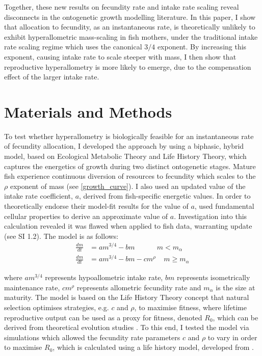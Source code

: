 \documentclass[a4paper]{article} %
\begin{document}
    Together, these new results on fecundity rate and intake rate scaling reveal disconnects in the ontogenetic growth modelling literature. In this paper, I show that allocation to fecundity, as an instantaneous rate, is theoretically unlikely to exhibit hyperallometric mass-scaling in fish mothers, under the traditional intake rate scaling regime which uses the canonical $3/4$ exponent. By increasing this exponent, causing intake rate to scale steeper with mass, I then show that reproductive hyperallometry is more likely to emerge, due to the compensation effect of the larger intake rate.
\section{Materials and Methods}\thispagestyle{plain}

To test whether hyperallometry is biologically feasible for an instantaneous rate of fecundity allocation, I developed the \textcite{Charnov2001} approach by using a biphasic, hybrid model, based on Ecological Metabolic Theory and Life History Theory, which captures the energetics of growth during two distinct ontogenetic stages. Mature fish experience continuous diversion of resources to fecundity which scales to the $\rho$ exponent of mass (see \cref{growth_curve}). I also used an updated value of the intake rate coefficient, $a$, derived from fish-specific energetic values. In order to theoretically endorse their model-fit results for the value of $a$, \textcite{West2001} used fundamental cellular properties to derive an approximate value of $a$. Investigation into this calculation revealed it was flawed when applied to fish data, warranting update (see SI 1.2). The model is as follows:
\begin{align}
    \frac{dm}{dt} &= am^{3/4} - bm \ \ \ \ \ \ \ \ \ \ \ \ \ \ m < m_{\alpha} \label{luke_model_juvenile}\\
    \frac{dm}{dt} &= am^{3/4} - bm - cm^{\rho} \ \ \ \ \ m \geq m_{\alpha} \label{luke_model}
\end{align}

where $am^{3/4}$ represents hypoallometric intake rate, $bm$ represents isometrically maintenance rate, $cm^{\rho}$ represents allometric fecundity rate and $m_{\alpha}$ is the size at maturity. The model is based on the Life History Theory concept that natural selection optimises strategies, e.g. $c$ and $\rho$, to maximise fitness, where lifetime reproductive output can be used as a proxy for fitness, denoted $R_0$, which can be derived from theoretical evolution studies \autocite{Charnov2001, stearns1992evolution}. To this end, I tested the model via simulations which allowed the fecundity rate parameters $c$ and $\rho$ to vary in order to maximise $R_0$, which is calculated using a life history model, developed from \textcite{Charnov2001}.
\end{document}
